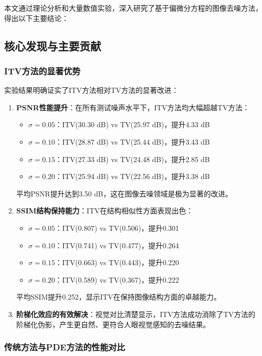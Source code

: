 \documentclass[a4paper,12pt]{ctexart}
\begin{document}
本文通过理论分析和大量数值实验，深入研究了基于偏微分方程的图像去噪方法，得出以下主要结论：

\subsection{核心发现与主要贡献}

\subsubsection{ITV方法的显著优势}

实验结果明确证实了ITV方法相对TV方法的显著改进：

\begin{enumerate}
    \item \textbf{PSNR性能提升}：在所有测试噪声水平下，ITV方法均大幅超越TV方法：
    \begin{itemize}
        \item $\sigma=0.05$：ITV(30.30 dB) vs TV(25.97 dB)，提升4.33 dB
        \item $\sigma=0.10$：ITV(28.87 dB) vs TV(25.44 dB)，提升3.43 dB  
        \item $\sigma=0.15$：ITV(27.33 dB) vs TV(24.48 dB)，提升2.85 dB
        \item $\sigma=0.20$：ITV(25.94 dB) vs TV(22.56 dB)，提升3.38 dB
    \end{itemize}
    平均PSNR提升达到3.50 dB，这在图像去噪领域是极为显著的改进。

    \item \textbf{SSIM结构保持能力}：ITV在结构相似性方面表现出色：
    \begin{itemize}
        \item $\sigma=0.05$：ITV(0.807) vs TV(0.506)，提升0.301
        \item $\sigma=0.10$：ITV(0.741) vs TV(0.477)，提升0.264
        \item $\sigma=0.15$：ITV(0.663) vs TV(0.443)，提升0.220  
        \item $\sigma=0.20$：ITV(0.589) vs TV(0.367)，提升0.222
    \end{itemize}
    平均SSIM提升0.252，显示ITV在保持图像结构方面的卓越能力。

    \item \textbf{阶梯化效应的有效解决}：视觉对比清楚显示，ITV方法成功消除了TV方法的阶梯化伪影，产生更自然、更符合人眼视觉感知的去噪结果。
\end{enumerate}

\subsubsection{传统方法与PDE方法的性能对比}
\end{document}
